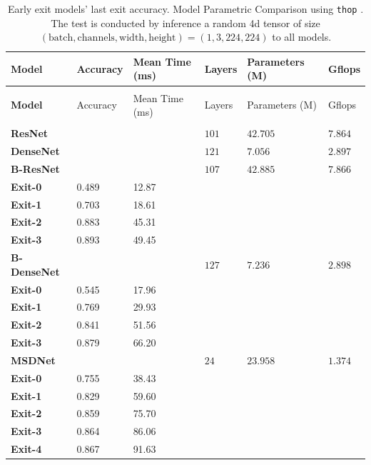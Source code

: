 \begin{longtabu}{>{\bfseries}X|X[r]|X[r]|X[r]|X[r]|X[r]}
	\caption[Early exit models' last exit accuracy]{Early exit models' last exit accuracy. Model Parametric Comparison using \texttt{thop} \cite{zhu_thop_nodate}. The test is conducted by inference a random 4d tensor of size $ (\mathrm{batch,channels,width,height})=(1,3,224,224) $ to all models.}\label{tbl:early-exit} \\
	\toprule
	\rowfont{\bfseries}
	Model & Accuracy & Mean Time (ms) & Layers & Parameters (M) & G\gls{flop}s \tabularnewline
	\hline
	\endfirsthead
	\\
	\toprule
	\rowfont{\bfseries}
	Model & Accuracy & Mean Time (ms) & Layers & Parameters (M) & G\gls{flop}s \tabularnewline
	\hline
	\endhead %
	\hline
	\\
	\endfoot
	\hline
	\endlastfoot
	ResNet  &  & & $ 101 $ & $ 42.705 $ & $ 7.864 $ \tabularnewline
	\hline
	DenseNet & & & $ 121 $ & $ 7.056 $ & $ 2.897 $ \tabularnewline
	\hline
	B-ResNet & & & $ 107 $ & $ 42.885 $ & $ 7.866 $ \tabularnewline 
	\hspace{3mm} Exit-0 & 0.489 & 12.87 & & & \tabularnewline
	\hspace{3mm} Exit-1 & 0.703 & 18.61 & & &\tabularnewline
	\hspace{3mm} Exit-2 & 0.883 & 45.31 & & &\tabularnewline
	\hspace{3mm} Exit-3 & 0.893 & 49.45 & & &\tabularnewline
	\hline
	B-DenseNet &  & & $ 127 $ & $ 7.236 $ & $ 2.898 $\tabularnewline
	\hspace{3mm} Exit-0 & 0.545 & 17.96 & & & \tabularnewline
	\hspace{3mm} Exit-1 & 0.769 & 29.93 & & &\tabularnewline
	\hspace{3mm} Exit-2 & 0.841 & 51.56 & & &\tabularnewline
	\hspace{3mm} Exit-3 & 0.879 & 66.20 & & &\tabularnewline
	\hline
	MSDNet & & & $ 24 $ & $ 23.958 $ & $ 1.374 $ \tabularnewline
	\hspace{3mm} Exit-0 & 0.755 & 38.43 & & &\tabularnewline
	\hspace{3mm} Exit-1 & 0.829 & 59.60 & & &\tabularnewline
	\hspace{3mm} Exit-2 & 0.859 & 75.70 & & &\tabularnewline
	\hspace{3mm} Exit-3 & 0.864 & 86.06 & & &\tabularnewline
	\hspace{3mm} Exit-4 & 0.867 & 91.63 & & &\tabularnewline
	\bottomrule
\end{longtabu}


